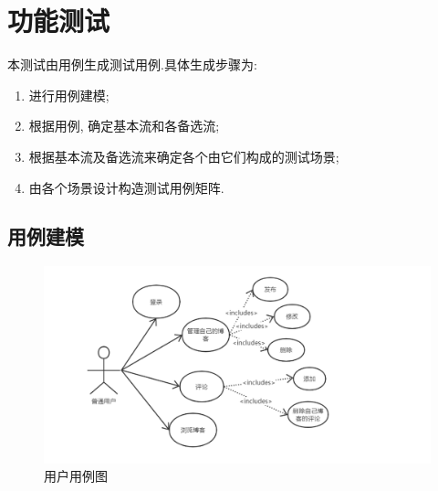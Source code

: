 \section{功能测试}
本测试由用例生成测试用例.具体生成步骤为:
\begin{enumerate}
	\item 进行用例建模;
	\item 根据用例, 确定基本流和各备选流;
	\item 根据基本流及备选流来确定各个由它们构成的测试场景;
	\item 由各个场景设计构造测试用例矩阵.
\end{enumerate}


\subsection{用例建模}
\begin{figure}[thbp!]
	\centering
	\includegraphics[width=0.8\linewidth]{figure/use_case}
	\caption{用户用例图}
\end{figure}
